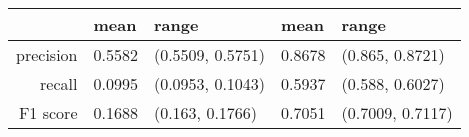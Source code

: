 \begin{table}[ht]
\centering
\begin{tabular}{rllll}
  \hline
 & mean & range & mean & range \\ 
  \hline
precision & 0.5582 & (0.5509, 0.5751) & 0.8678 & (0.865, 0.8721) \\ 
  recall & 0.0995 & (0.0953, 0.1043) & 0.5937 & (0.588, 0.6027) \\ 
  F1 score & 0.1688 & (0.163, 0.1766) & 0.7051 & (0.7009, 0.7117) \\ 
   \hline
\end{tabular}
\end{table}

